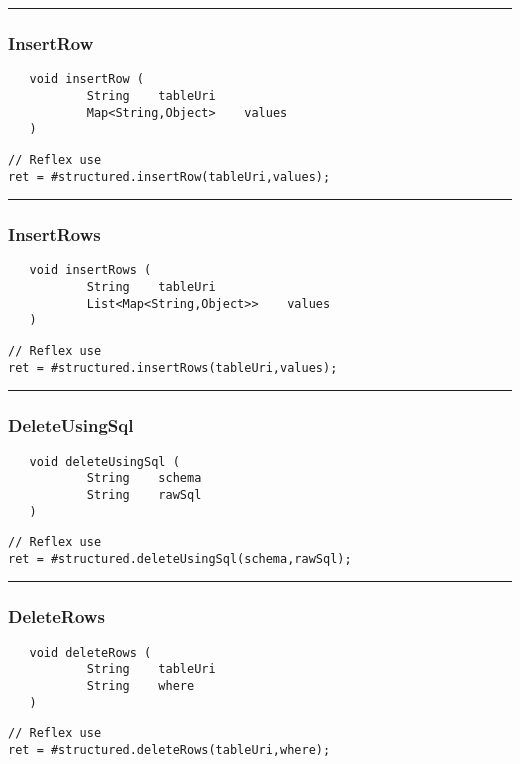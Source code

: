 \rule{15cm}{2pt}
\subsubsection{InsertRow}
\label{Api:InsertRow}
\begin{verbatim}
   void insertRow (
           String    tableUri
           Map<String,Object>    values
   )
\end{verbatim}
\begin{lstlisting}[language=reflex]
// Reflex use
ret = #structured.insertRow(tableUri,values);
\end{lstlisting}



\rule{15cm}{2pt}
\subsubsection{InsertRows}
\label{Api:InsertRows}
\begin{verbatim}
   void insertRows (
           String    tableUri
           List<Map<String,Object>>    values
   )
\end{verbatim}
\begin{lstlisting}[language=reflex]
// Reflex use
ret = #structured.insertRows(tableUri,values);
\end{lstlisting}



\rule{15cm}{2pt}
\subsubsection{DeleteUsingSql}
\label{Api:DeleteUsingSql}
\begin{verbatim}
   void deleteUsingSql (
           String    schema
           String    rawSql
   )
\end{verbatim}
\begin{lstlisting}[language=reflex]
// Reflex use
ret = #structured.deleteUsingSql(schema,rawSql);
\end{lstlisting}



\rule{15cm}{2pt}
\subsubsection{DeleteRows}
\label{Api:DeleteRows}
\begin{verbatim}
   void deleteRows (
           String    tableUri
           String    where
   )
\end{verbatim}
\begin{lstlisting}[language=reflex]
// Reflex use
ret = #structured.deleteRows(tableUri,where);
\end{lstlisting}



